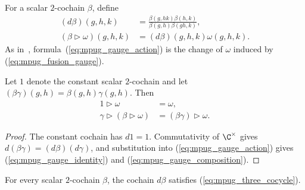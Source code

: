 \begin{definition}
    \label{def:mpug_fusion_gauge}
    \leanok
    For a scalar $2$-cochain $\beta$, define
    \begin{align}
        (d\beta)(g,h,k)
         & =\frac{\beta(g,hk)\beta(h,k)}
        {\beta(g,h)\beta(gh,k)},
        \label{eq:mpug_coboundary}        \\
        (\beta\mathbin{\triangleright}\omega)(g,h,k)
         & =(d\beta)(g,h,k)\omega(g,h,k).
        \label{eq:mpug_gauge_action}
    \end{align}
    As in~\cite{FrancoRubio2025MPUGauging}, formula~(\ref{eq:mpug_gauge_action})
    is the change of $\omega$ induced by (\ref{eq:mpug_fusion_gauge}).
\end{definition}

\begin{lemma}
    \label{thm:mpug_gauge_action}
    \leanok
    Let $1$ denote the constant scalar $2$-cochain and let
    $(\beta\gamma)(g,h)=\beta(g,h)\gamma(g,h)$. Then
    \begin{align}
        1\mathbin{\triangleright}\omega & =\omega,
        \label{eq:mpug_gauge_identity}                                                  \\
        \gamma\mathbin{\triangleright}
        (\beta\mathbin{\triangleright}\omega)
                                        & =(\beta\gamma)\mathbin{\triangleright}\omega.
        \label{eq:mpug_gauge_composition}
    \end{align}
\end{lemma}

\begin{proof}\leanok
    The constant cochain has $d1=1$. Commutativity of $\C^\times$ gives
    $d(\beta\gamma)=(d\beta)(d\gamma)$, and substitution into
    (\ref{eq:mpug_gauge_action}) gives
    (\ref{eq:mpug_gauge_identity}) and
    (\ref{eq:mpug_gauge_composition}).
\end{proof}

\begin{lemma}
    \label{thm:mpug_coboundary_cocycle}
    \leanok
    For every scalar $2$-cochain $\beta$, the cochain $d\beta$ satisfies
    (\ref{eq:mpug_three_cocycle}).
\end{lemma}


